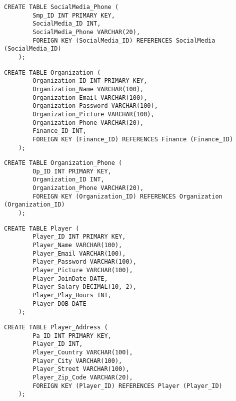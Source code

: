     \begin{lstlisting}[caption={Create SocialMedia Phone table}, label={lst:create_socialmedia_phone}]
    CREATE TABLE SocialMedia_Phone (
        Smp_ID INT PRIMARY KEY,
        SocialMedia_ID INT,
        SocialMedia_Phone VARCHAR(20),
        FOREIGN KEY (SocialMedia_ID) REFERENCES SocialMedia (SocialMedia_ID)
    );
    \end{lstlisting}
    \clearpage
    \begin{lstlisting}[caption={Create Organization table}, label={lst:create_organization}]
    CREATE TABLE Organization (
        Organization_ID INT PRIMARY KEY,
        Organization_Name VARCHAR(100),
        Organization_Email VARCHAR(100),
        Organization_Password VARCHAR(100),
        Organization_Picture VARCHAR(100),
        Organization_Phone VARCHAR(20),
        Finance_ID INT,
        FOREIGN KEY (Finance_ID) REFERENCES Finance (Finance_ID)
    );
    \end{lstlisting}
    
    \begin{lstlisting}[caption={Create Organization Phone table}, label={lst:create_organization_phone}]
    CREATE TABLE Organization_Phone (
        Op_ID INT PRIMARY KEY,
        Organization_ID INT,
        Organization_Phone VARCHAR(20),
        FOREIGN KEY (Organization_ID) REFERENCES Organization (Organization_ID)
    );
    \end{lstlisting}
    
    \begin{lstlisting}[caption={Create Player table}, label={lst:create_player}]
    CREATE TABLE Player (
        Player_ID INT PRIMARY KEY,
        Player_Name VARCHAR(100),
        Player_Email VARCHAR(100),
        Player_Password VARCHAR(100),
        Player_Picture VARCHAR(100),
        Player_JoinDate DATE,
        Player_Salary DECIMAL(10, 2),
        Player_Play_Hours INT,
        Player_DOB DATE
    );
    \end{lstlisting}
    
    \begin{lstlisting}[caption={Create Player Address table}, label={lst:create_player_address}]
    CREATE TABLE Player_Address (
        Pa_ID INT PRIMARY KEY,
        Player_ID INT,
        Player_Country VARCHAR(100),
        Player_City VARCHAR(100),
        Player_Street VARCHAR(100),
        Player_Zip_Code VARCHAR(20),
        FOREIGN KEY (Player_ID) REFERENCES Player (Player_ID)
    );
    \end{lstlisting}

